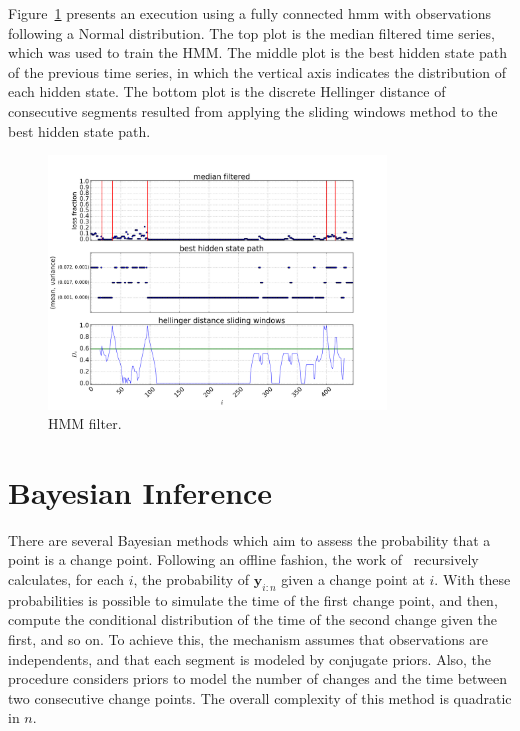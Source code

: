 Figure~\ref{fig:hmm_filter} presents an execution using a fully connected \gls*{hmm}
with observations following a Normal distribution.
The top plot is the median filtered time series, which was used to train the
HMM.
The middle plot is the best hidden state path of the previous time series,
in which the vertical axis indicates the distribution of each hidden state.
The bottom plot is the discrete Hellinger distance of consecutive segments
resulted from applying the sliding windows method to the best hidden state path.

\begin{figure}[H]
    \centering
    \includegraphics[width=0.8\textwidth]{./figures/change_point_detection/gaussian_hmm/id115_serverRJODTCLDM031_mac64:66:B3:7B:A1:B8_dtstart2016-05-01_dtend2016-05-11.png}
    \caption{HMM filter.}
\label{fig:hmm_filter}
\end{figure}%

\section{Bayesian Inference}

There are several Bayesian methods which aim to assess the probability that a
point is a change point. Following an offline fashion, the work
of~\cite{exact_and_efficient_bayesian_inference_for_multiple_changepoint_problems}
recursively calculates, for each $i$, the probability of $\mathbf{y}_{i : n}$
given a change point at $i$. With these probabilities is possible to simulate
the time of the first change point, and then, compute the conditional
distribution of the time of the second change given the first, and so on. To
achieve this, the mechanism assumes that observations are independents, and that
each segment is modeled by conjugate priors. Also, the procedure considers
priors to model the number of changes and the time between two consecutive
change points. The overall complexity of this method is quadratic in $n$.

